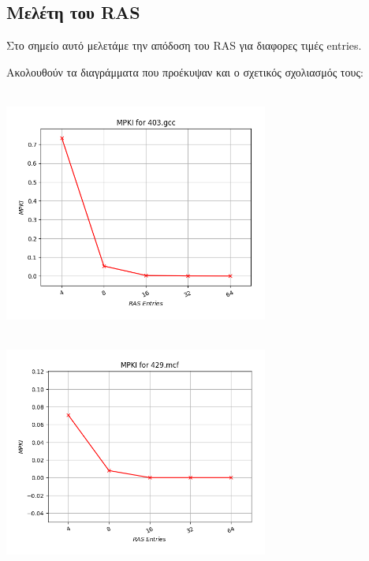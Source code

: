 \newpage
\subsection{Μελέτη του RAS}
\vspace{3mm}

Στο σημείο αυτό μελετάμε την απόδοση του RAS για διαφορες τιμές entries.

\vspace{1em}    
Ακολουθούν τα διαγράμματα που προέκυψαν και ο σχετικός σχολιασμός
τους:

   \begin{minipage}{\textwidth}
      \begin{center}
         \\
         \vspace{3mm}
         \includegraphics[width=0.65\textwidth, frame]{./graphs/4-4/403-gcc.png}
         \vspace{6mm}
      \end{center}
   \end{minipage}

   \begin{minipage}{\textwidth}
      \begin{center}
         \\
         \vspace{3mm}
         \includegraphics[width=0.65\textwidth, frame]{./graphs/4-4/429-mcf.png}
         \vspace{6mm}
      \end{center}
   \end{minipage}

